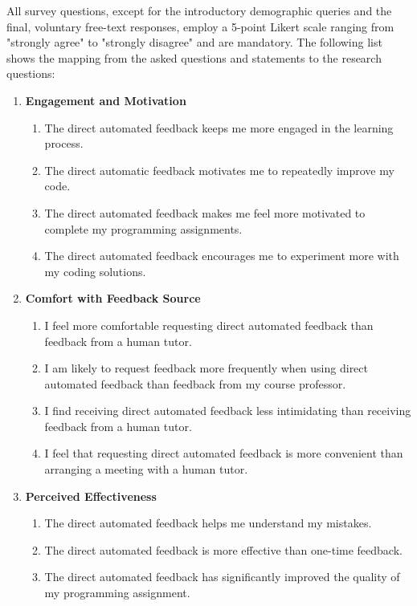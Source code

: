 \documentclass[manuscript,screen,review]{acmart}
\begin{document}
All survey questions, except for the introductory demographic queries and the final, voluntary free-text responses, employ a 5-point Likert scale \cite{allen:2007:LikertScalesData} ranging from "strongly agree" to "strongly disagree" and are mandatory.
The following list shows the mapping from the asked questions and statements to the research questions:

\begin{enumerate}[label=\textbf{RQ\arabic*}]
  \item \textbf{Engagement and Motivation}
    \begin{enumerate}[label=\textbf{Q\arabic*},resume]
      \item The direct automated feedback keeps me more engaged in the learning process.
      \item The direct automatic feedback motivates me to repeatedly improve my code.
      \item The direct automated feedback makes me feel more motivated to complete my programming assignments.
      \item The direct automated feedback encourages me to experiment more with my coding solutions.
    \end{enumerate}
  \item \textbf{Comfort with Feedback Source}
  \begin{enumerate}[label=\textbf{Q\arabic*},resume]
    \item I feel more comfortable requesting direct automated feedback than feedback from a human tutor.
    \item I am likely to request feedback more frequently when using direct automated feedback than feedback from my course professor.
    \item I find receiving direct automated feedback less intimidating than receiving feedback from a human tutor.
    \item I feel that requesting direct automated feedback is more convenient than arranging a meeting with a human tutor.
  \end{enumerate}
  \item \textbf{Perceived Effectiveness}
    \begin{enumerate}[label=\textbf{Q\arabic*},resume]
      \item The direct automated feedback helps me understand my mistakes.
      \item The direct automated feedback is more effective than one-time feedback.
      \item The direct automated feedback has significantly improved the quality of my programming assignment.

\end{enumerate}
\end{enumerate}
\end{document}

